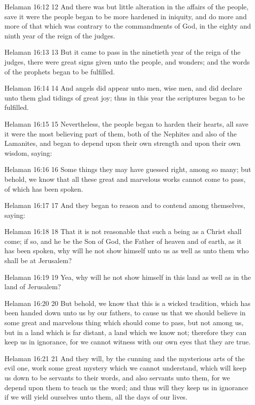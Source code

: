 Helaman 16:12
 12 And there was but little alteration in the affairs of the
people, save it were the people began to be more hardened in
iniquity, and do more and more of that which was contrary to the
commandments of God, in the eighty and ninth year of the reign of
the judges.

Helaman 16:13
 13 But it came to pass in the ninetieth year of the reign of the
judges, there were great signs given unto the people, and
wonders; and the words of the prophets began to be fulfilled.

Helaman 16:14
 14 And angels did appear unto men, wise men, and did declare
unto them glad tidings of great joy; thus in this year the
scriptures began to be fulfilled.

Helaman 16:15
 15 Nevertheless, the people began to harden their hearts, all
save it were the most believing part of them, both of the
Nephites and also of the Lamanites, and began to depend upon
their own strength and upon their own wisdom, saying:

Helaman 16:16
 16 Some things they may have guessed right, among so many; but
behold, we know that all these great and marvelous works cannot
come to pass, of which has been spoken.

Helaman 16:17
 17 And they began to reason and to contend among themselves,
saying:

Helaman 16:18
 18 That it is not reasonable that such a being as a Christ shall
come; if so, and he be the Son of God, the Father of heaven and
of earth, as it has been spoken, why will he not show himself
unto us as well as unto them who shall be at Jerusalem?

Helaman 16:19
 19 Yea, why will he not show himself in this land as well as in
the land of Jerusalem?

Helaman 16:20
 20 But behold, we know that this is a wicked tradition, which
has been handed down unto us by our fathers, to cause us that we
should believe in some great and marvelous thing which should
come to pass, but not among us, but in a land which is far
distant, a land which we know not; therefore they can keep us in
ignorance, for we cannot witness with our own eyes that they are
true.

Helaman 16:21
 21 And they will, by the cunning and the mysterious arts of the
evil one, work some great mystery which we cannot understand,
which will keep us down to be servants to their words, and also
servants unto them, for we depend upon them to teach us the word;
and thus will they keep us in ignorance if we will yield
ourselves unto them, all the days of our lives.

